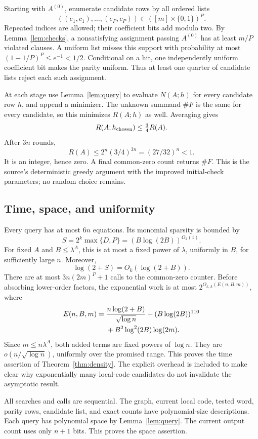 \documentclass[11pt]{article}
\theoremstyle{remark}
\begin{document}
Starting with \(A^{(0)}\), enumerate candidate rows by all ordered
lists
\[
 ((e_1,c_1),\ldots,(e_P,c_P))
       \in([m]\times\{0,1\})^P.
\]
Repeated indices are allowed; their coefficient bits add modulo two.
By Lemma~\ref{lem:checks}, a nonsatisfying assignment passing
\(A^{(0)}\) has at least \(m/P\) violated clauses.
A uniform list misses this support with probability at most
\((1-1/P)^P\le e^{-1}<1/2\). Conditional on a hit, one independently
uniform coefficient bit makes the parity uniform.
Thus at least one quarter of candidate lists reject each such
assignment.

At each stage use Lemma~\ref{lem:query} to evaluate \(N(A;h)\)
for every candidate row \(h\), and append a minimizer.
The unknown summand \(\#F\) is the same for every candidate,
so this minimizes \(R(A;h)\) as well. Averaging gives
\[
 R(A;h_{\rm chosen})\le\tfrac34 R(A).
\]
After \(3n\) rounds,
\[
 R(A)\le2^n(3/4)^{3n}=(27/32)^n<1.
\]
It is an integer, hence zero. A final common-zero count returns \(\#F\).
This is the source's deterministic greedy argument with the improved
initial-check parameters; no random choice remains.

\subsection{Time, space, and uniformity}
Every query has at most \(6n\) equations. Its monomial sparsity is bounded by
\[
 S=2^k\max\{D,P\}=(B\log(2B))^{O_k(1)}.
\]
For fixed \(A\) and \(B\le\lambda^A\), this is at most a fixed power
of \(\lambda\), uniformly in \(B\), for sufficiently large \(n\).
Moreover,
\[
 \log(2+S)=O_k(\log(2+B)).
\]
There are at most \(3n(2m)^P+1\) calls to the common-zero counter.
Before absorbing lower-order factors, the exponential work is at most
\(2^{O_{k,A}(E(n,B,m))}\), where
\begin{align}
 E(n,B,m)={}&
 \frac{n\log(2+B)}{\sqrt{\log n}}+(B\log(2B))^{110}\notag\\
 &+B^2\log^2(2B)\log(2m).\label{eq:full-overhead}
\end{align}
Since \(m\le n\lambda^A\), both added terms are fixed powers of
\(\log n\). They are \(o(n/\sqrt{\log n})\), uniformly over the
promised range. This proves the time assertion of
Theorem~\ref{thm:density}. The explicit overhead is included to make clear
why exponentially many local-code candidates do not invalidate the
asymptotic result.

All searches and calls are sequential. The graph, current local code,
tested word, parity rows, candidate list, and exact counts have
polynomial-size descriptions. Each query has polynomial space by
Lemma~\ref{lem:query}. The current output count uses only \(n+1\)
bits. This proves the space assertion.
\end{document}
